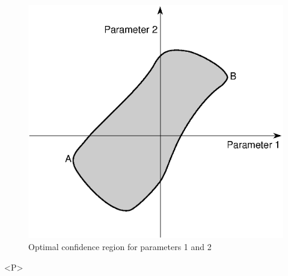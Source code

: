 \begin{htmlonly}
\begin{figure}
\begin{makeimage}
\includegraphics[width=\linewidth]{minosco3.eps}
\end{makeimage}
\caption{Optimal confidence region for parameters 1 and 2}
\label{fig:MINosconf3}
\end{figure}
\begin{rawhtml}<P>\end{rawhtml}
\end{htmlonly}
 
